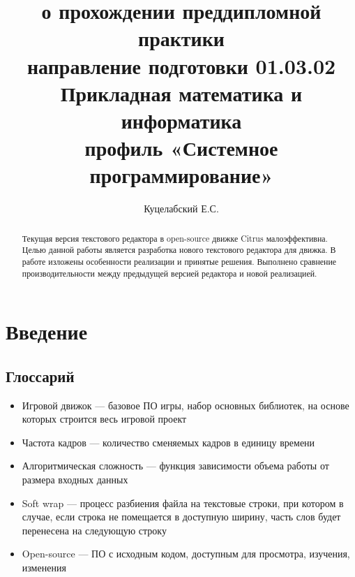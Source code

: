 \documentclass{fefu}
\begin{document}
	\title{о прохождении преддипломной практики\\направление подготовки 01.03.02 
	Прикладная математика и информатика\\профиль «Системное программирование»}
	\author{Куцелабский Е.С.}
	
	\makereporttitle
	\tableofcontents
	\newpage
	
	\begin{abstract}
		\par Текущая версия текстового редактора в open-source движке Citrus малоэффективна.
		Целью данной работы является разработка нового текстового редактора для 
		движка. В работе изложены особенности реализации и принятые решения.
		Выполнено сравнение производительности между предыдущей версией редактора и
		новой реализацией.

	\end{abstract}

	\section{Введение}
		\subsection{Глоссарий}
			\begin{itemize}
				\item Игровой движок --- базовое ПО игры, набор основных библиотек, на основе
				которых строится весь игровой проект
				\item Частота кадров --- количество сменяемых кадров в единицу времени
				\item Алгоритмическая сложность --- функция зависимости объема работы от 
				размера входных данных
				\item Soft wrap --- процесс разбиения файла на текстовые строки, при котором
				в случае, если строка не помещается в доступную ширину, часть слов будет
				перенесена на следующую строку
				\item Open-source --- ПО с исходным кодом, доступным для просмотра, изучения, 
				изменения
			\end{itemize}
\end{document}

